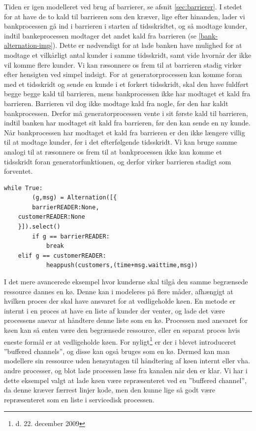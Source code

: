 Tiden er igen modelleret ved brug af barrierer, se afsnit \cref{sec:barrierer}. I 
stedet for at have de to kald til barrieren som den kræver, lige efter hinanden, lader 
vi bankprocessen gå ind i barrieren i starten af tidsskridtet, og så modtage 
kunder, indtil bankeprocessen modtager det andet kald fra barrieren (se 
\cref{bank-alternation-imp}). Dette er nødvendigt for at lade banken have 
mulighed for at modtage et vilkårligt antal kunder i samme tidsskridt, samt 
vide hvornår der ikke vil komme flere kunder.  Vi kan ræsonnere os frem til at 
barrieren stadig virker efter hensigten ved  simpel indsigt.
For at generatorprocessen kan komme foran med et tidsskridt og sende en kunde i et forkert tidsskridt,
skal den have fuldført begge begge kald til barrieren, mens bankprocessen ikke 
har modtaget et kald fra barrieren. Barrieren vil dog ikke modtage kald fra 
nogle, før den har  kaldt bankprocessen. Derfor må generatorprocessen vente i 
sit første kald til barrieren, indtil banken har modtaget sit kald fra 
barrieren, før den kan sende en ny kunde.
Når bankprocessen har modtaget et kald fra barrieren er den ikke længere villig 
til at modtage kunder, før i det efterfølgende tidsskridt. Vi kan bruge samme 
analogi til at ræsonnere os frem til at bankprocessen ikke kan komme et 
tidsskridt foran generatorfunktionen, og derfor virker barrieren stadigt som 
forventet. 

\begin{lstlisting}[float=hbtp,label=bank-alternation-imp,caption=Modtage en 
  kunde eller barrierekald i Bankprocessen]
while True:
		(g,msg) = Alternation([{
		barrierREADER:None,
    customerREADER:None
    }]).select()
		if g == barrierREADER:
			break
    elif g == customerREADER:
			heappush(customers,(time+msg.waittime,msg))
\end{lstlisting}


I det mere avancerede eksempel hvor kunderne skal tilgå den samme begrænsede 
ressource dannes en kø. Denne kan i \pycsp modeleres på flere måder, afhængigt 
at hvilken proces der skal have ansvaret for at vedligeholde køen. En metode er 
internt i en proces at have en liste af kunder der venter, og lade det være 
processens ansvar at håndtere denne liste som en kø. Processen med ansvaret for køen kan 
så enten være den begrænsede ressource, eller en separat proces hvis eneste 
formål er at vedligeholde køen. For nyligt\footnote{d. 22. december 2009} er 
der i \pycsp blevet introduceret ''buffered channels''\cite{pycsp-r147}, og 
disse kan også bruges som en kø. Dermed kan man modellere sin ressource uden 
hensyntagen til håndtering af køen internt eller vha. andre processer, og blot 
lade processen læse fra kanalen når den er klar. Vi har i dette eksempel valgt 
at lade køen være repræsenteret ved en ''buffered channel'', da denne  kræver 
færrest linjer kode, men den kunne lige så godt være repræsenteret som en liste 
i servicedisk processen.


